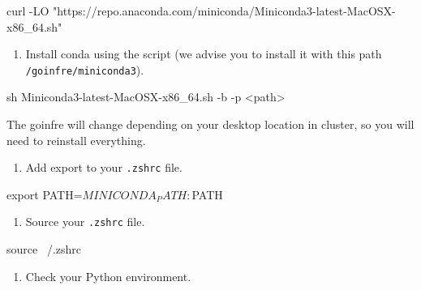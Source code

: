 \documentclass[]{article}
\newenvironment{Shaded}{\begin{snugshade}}{\end{snugshade}}
\newcommand{\NormalTok}[1]{\textcolor[rgb]{0.81,0.81,0.76}{#1}}
\providecommand{\tightlist}{%
  \setlength{\itemsep}{0pt}\setlength{\parskip}{0pt}}
\begin{document}
\begin{Shaded}
\begin{Highlighting}[]
\NormalTok{curl -LO "https://repo.anaconda.com/miniconda/Miniconda3-latest-MacOSX-x86_64.sh"}
\end{Highlighting}
\end{Shaded}

\begin{enumerate}
\def\labelenumi{\arabic{enumi}.}
\setcounter{enumi}{1}
\tightlist
\item
  Install conda using the script (we advise you to install it with this
  path \texttt{/goinfre/miniconda3}).
\end{enumerate}

\begin{Shaded}
\begin{Highlighting}[]
\NormalTok{sh Miniconda3-latest-MacOSX-x86_64.sh -b -p <path>}
\end{Highlighting}
\end{Shaded}

The goinfre will change depending on your desktop location in cluster,
so you will need to reinstall everything.

\begin{enumerate}
\def\labelenumi{\arabic{enumi}.}
\setcounter{enumi}{2}
\tightlist
\item
  Add export to your \texttt{.zshrc} file.
\end{enumerate}

\begin{Shaded}
\begin{Highlighting}[]
\NormalTok{export PATH=$MINICONDA_PATH:$PATH}
\end{Highlighting}
\end{Shaded}

\begin{enumerate}
\def\labelenumi{\arabic{enumi}.}
\setcounter{enumi}{3}
\tightlist
\item
  Source your \texttt{.zshrc} file.
\end{enumerate}

\begin{Shaded}
\begin{Highlighting}[]
\NormalTok{source ~/.zshrc}
\end{Highlighting}
\end{Shaded}

\begin{enumerate}
\def\labelenumi{\arabic{enumi}.}
\setcounter{enumi}{4}
\tightlist
\item
  Check your Python environment.
\end{enumerate}
\end{document}
